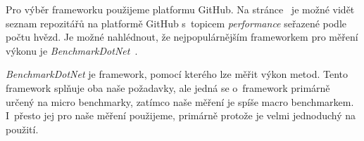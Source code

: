 Pro výběr frameworku použijeme platformu GitHub. Na stránce~\cite{github_performance} je možné vidět seznam repozitářů na platformě GitHub s~topicem \textit{performance} seřazené podle počtu hvězd. Je možné nahlédnout, že nejpopulárnějším frameworkem pro měření výkonu je \textit{BenchmarkDotNet}~\cite{BenchmarkDotNet}.

\textit{BenchmarkDotNet} je framework, pomocí kterého lze měřit výkon metod. Tento framework splňuje oba naše požadavky, ale jedná se o~framework primárně určený na micro benchmarky, zatímco naše měření je spíše macro benchmarkem. I~přesto jej pro naše měření použijeme, primárně protože je velmi jednoduchý na použití.





















